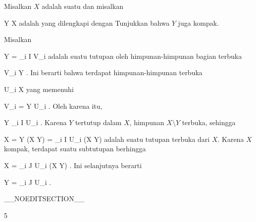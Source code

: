 {

Misalkan $X$ adalah suatu
dan misalkan

\mavergleichskette
{\vergleichskette
{Y
}
{ \subseteq }{ X
}
{  }{
}
{    }{
}
{   }{
}
}
{}{}{}
adalah
yang dilengkapi dengan
Tunjukkan bahwa $Y$ juga kompak.

}
{

Misalkan

\mavergleichskettedisp
{\vergleichskette
{ Y
}
{ =} { \bigcup_{i \in I} V_i
}
{ } {
}
{ } {
}
{ } {
}
}
{}{}{}
adalah suatu tutupan oleh himpunan-himpunan bagian terbuka

\mavergleichskette
{\vergleichskette
{ V_i
}
{ \subseteq }{ Y
}
{  }{
}
{    }{
}
{   }{
}
}
{}{}{.}
Ini berarti bahwa terdapat himpunan-himpunan terbuka

\mavergleichskette
{\vergleichskette
{ U_i
}
{ \subseteq }{ X
}
{  }{
}
{    }{
}
{   }{
}
}
{}{}{}
yang memenuhi

\mavergleichskette
{\vergleichskette
{ V_i
}
{ = }{ Y \cap U_i
}
{  }{
}
{    }{
}
{   }{
}
}
{}{}{.}
Oleh karena itu,

\mavergleichskettedisp
{\vergleichskette
{ Y
}
{ \subseteq} { \bigcup_{i \in I} U_i
}
{ } {
}
{ } {
}
{ } {
}
}
{}{}{.}
Karena $Y$ tertutup dalam $X$, himpunan $X \setminus Y$ terbuka, sehingga

\mavergleichskettedisp
{\vergleichskette
{ X
}
{ =} { Y \cup (X \setminus Y)
}
{ =} { \bigcup_{i \in I} U_i  \cup  (X \setminus Y)
}
{ } {
}
{ } {
}
}
{}{}{}
adalah suatu tutupan terbuka dari $X$. Karena $X$ kompak, terdapat suatu subtutupan berhingga

\mavergleichskettedisp
{\vergleichskette
{ X
}
{ =} { \bigcup_{i \in J} U_i  \cup  (X \setminus Y)
}
{ } {
}
{ } {
}
{ } {}
}
{}{}{.}
Ini selanjutnya berarti

\mavergleichskettedisp
{\vergleichskette
{ Y
}
{ =} { \bigcup_{i \in J} U_i
}
{ } {
}
{ } {
}
{ } {}
}
{}{}{.}

 }

__NOEDITSECTION__

{5}

